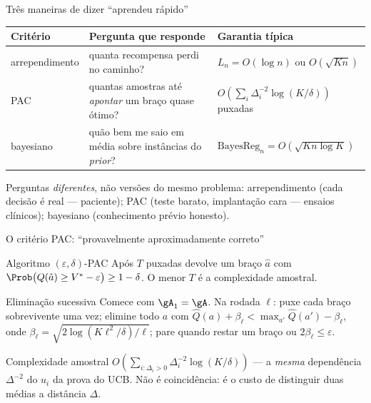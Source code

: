 \documentclass[aspectratio=169, 11pt]{beamer}
\newcommand{\Qh}{\widehat{Q}}
\begin{document}
\begin{frame}{Três maneiras de dizer ``aprendeu rápido''}
  \begin{center}\footnotesize
  \begin{tabular}{@{}p{2.4cm}p{4.1cm}p{4.6cm}@{}}
    \toprule
    \textbf{Critério} & \textbf{Pergunta que responde} & \textbf{Garantia típica} \\
    \midrule
    arrependimento & quanta recompensa perdi no caminho? & $L_n = O(\log n)$ ou $O(\sqrt{Kn})$ \\[0.3em]
    PAC & quantas amostras até \emph{apontar} um braço quase ótimo? &
      $O\!\left(\sum_i \Delta_i^{-2}\log(K/\delta)\right)$ puxadas \\[0.3em]
    bayesiano & quão bem me saio em média sobre instâncias do \emph{prior}? &
      $\mathrm{BayesReg}_n = O(\sqrt{Kn\log K})$ \\
    \bottomrule
  \end{tabular}
  \end{center}

  \begin{ideiabox}
    Perguntas \emph{diferentes}, não versões do mesmo problema:
    arrependimento (cada decisão é real — paciente); PAC (teste barato,
    implantação cara — ensaios clínicos); bayesiano (conhecimento prévio
    honesto).
  \end{ideiabox}
\end{frame}

\begin{frame}{O critério PAC: ``provavelmente aproximadamente correto''}
  \begin{defbox}{Algoritmo $(\varepsilon,\delta)$-PAC}
    Após $T$ puxadas devolve um braço $\hat{a}$ com
    $\Prob\bigl(Q(\hat{a}) \ge V^{*}-\varepsilon\bigr) \ge 1-\delta$. O menor
    $T$ é a \alert{complexidade amostral}.
  \end{defbox}

  \begin{algbox}{Eliminação sucessiva}
    {\small Comece com $\gA_1=\gA$. Na rodada $\ell$: puxe cada braço
    sobrevivente uma vez; elimine todo $a$ com
    $\Qh(a)+\beta_\ell < \max_{a'}\Qh(a')-\beta_\ell$, onde
    $\beta_\ell = \sqrt{2\log(K\ell^{2}/\delta)/\ell}$; pare quando restar um
    braço ou $2\beta_\ell \le \varepsilon$.}
  \end{algbox}

  {\small Complexidade amostral $O\!\left(\sum_{i:\Delta_i>0}\Delta_i^{-2}
  \log(K/\delta)\right)$ --- a \emph{mesma} dependência $\Delta^{-2}$ do $u_i$
  da prova do UCB. Não é coincidência: é o custo de distinguir duas médias a
  distância $\Delta$.}
\end{frame}
\end{document}
